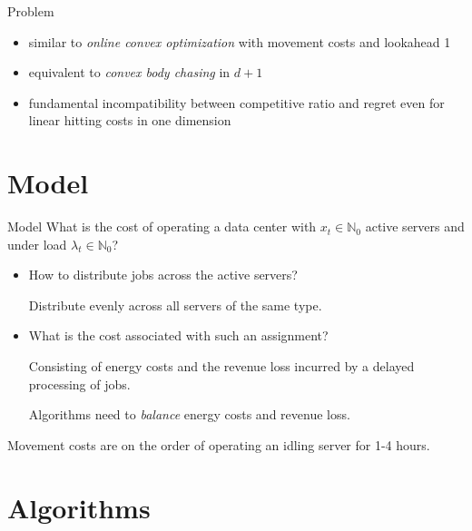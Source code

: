 \documentclass{beamer}
\def\spadding{\vspace{0.25cm}}
\begin{document}
\begin{frame}{Problem}
\begin{itemize}
    \item similar to \emph{online convex optimization} with movement costs and lookahead 1\pause
    \item equivalent to \emph{convex body chasing} in $d + 1$\pause
    \item fundamental incompatibility between competitive ratio and regret even for linear hitting costs in one dimension
\end{itemize}
\end{frame}

\section{Model}

\begin{frame}{Model}
What is the cost of operating a data center with $x_t \in \mathbb{N}_0$ active servers and under load $\lambda_t \in \mathbb{N}_0$?\pause
\begin{itemize}
    \item How to distribute jobs across the active servers?\pause\par
        Distribute evenly across all servers of the same type.
    \item What is the cost associated with such an assignment?\pause\par
        Consisting of energy costs and the revenue loss incurred by a delayed processing of jobs.\pause\par
        Algorithms need to \emph{balance} energy costs and revenue loss.
\end{itemize}\pause\spadding

Movement costs are on the order of operating an idling server for 1-4 hours.
\end{frame}

\section{Algorithms}
\end{document}

